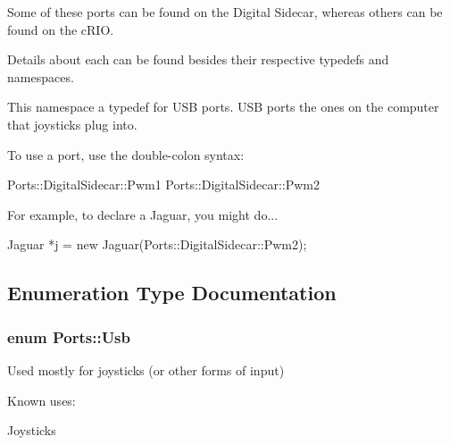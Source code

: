 \-Some of these ports can be found on the \-Digital \-Sidecar, whereas others can be found on the c\-R\-I\-O.

\-Details about each can be found besides their respective typedefs and namespaces.

\-This namespace a typedef for \-U\-S\-B ports. \-U\-S\-B ports the ones on the computer that joysticks plug into.

\-To use a port, use the double-\/colon syntax\-: 
\begin{DoxyCode}
 Ports::DigitalSidecar::Pwm1
 Ports::DigitalSidecar::Pwm2
\end{DoxyCode}


\-For example, to declare a \-Jaguar, you might do... 
\begin{DoxyCode}
 Jaguar *j = new Jaguar(Ports::DigitalSidecar::Pwm2);
\end{DoxyCode}
 

\subsection{\-Enumeration \-Type \-Documentation}
\hypertarget{namespace_ports_a75eeb68b25771e471390419d37f86153}{
\subsubsection[{\-Usb}]{\setlength{\rightskip}{0pt plus 5cm}enum {\bf \-Ports\-::\-Usb}}}\label{namespace_ports_a75eeb68b25771e471390419d37f86153}


\-Used mostly for joysticks (or other forms of input) 

\-Known uses\-:
\begin{DoxyItemize}
\item \-Joysticks
\end{DoxyItemize}

